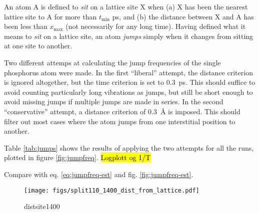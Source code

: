 \documentclass[11pt,bibliography=totoc,index=totoc]{scrbook}   %
\newcommand{\comment}[1]{\hl{#1}}
\begin{document}
An atom A is defined to \emph{sit} on a lattice site X when (a) X has been the nearest lattice site to A for more than $t_{\text{min}}$ ps, and (b) the distance between X and A has been less than $x_{\text{max}}$ (not necessarily for any long time). Having defined what it means to \emph{sit} on a lattice site, an atom \emph{jumps} simply when it changes from sitting at one site to another.

Two different attemps at calculating the jump frequencies of the single phosphorus atom were made.
In the first ``liberal'' attempt, the distance criterion is ignored altogether, but the time criterion is set to 0.3~ps.
This should suffice to avoid counting particularly long vibrations as jumps, but still be short enough to avoid missing jumps if multiple jumps are made in series. 
In the second ``conservative'' attempt, a distance criterion of 0.3~Å is imposed. This should filter out most cases where the atom jumps from one interstitial position to another. 

Table \ref{tab:jumps} shows the results of applying the two attempts for all the runs, plotted in figure \ref{fig:jumpfreq}. \comment{Logplott og 1/T}

Compare with eq. \eqref{eq:jumpfreq-est} and fig. \ref{fig:jumpfreq-est}.

\begin{figure}[htbp]
  \centering
  \texttt{[image: figs/split110\_1400\_dist\_from\_lattice.pdf]}
  \caption{distsite1400}
  \label{fig:distsite1400}
\end{figure}
\end{document}
